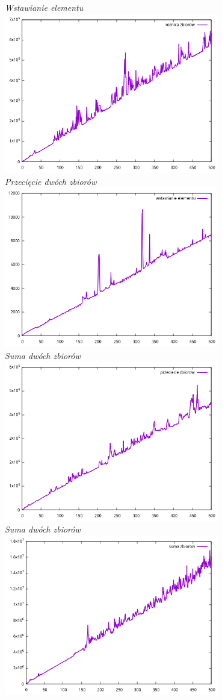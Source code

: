 \documentclass{article}
\begin{document}
\begin{center}
    \textit{Wstawianie elementu\\}
    \includegraphics[width=0.7\textwidth]{difference}\\
    \textit{Przecięcie dwóch zbiorów\\}
    \includegraphics[width=0.7\textwidth]{insert}\\
    \textit{Suma dwóch zbiorów\\}
    \includegraphics[width=0.7\textwidth]{intersection}\\
    \textit{Suma dwóch zbiorów\\}
    \includegraphics[width=0.7\textwidth]{unify}\\
\end{center}

\cite{}
\end{document}
